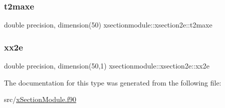 \mbox{\label{structxsectionmodule_1_1xsection2e_aeff16d0efeb0ea2455d947cf854663ec}} 
\subsubsection{\texorpdfstring{t2maxe}{t2maxe}}
{\footnotesize\ttfamily double precision, dimension(50) xsectionmodule\+::xsection2e\+::t2maxe}

\mbox{\label{structxsectionmodule_1_1xsection2e_a2462144f551e80966964150190bcd213}} 
\subsubsection{\texorpdfstring{xx2e}{xx2e}}
{\footnotesize\ttfamily double precision, dimension(50,1) xsectionmodule\+::xsection2e\+::xx2e}



The documentation for this type was generated from the following file\+:\begin{DoxyCompactItemize}
\item 
src/\hyperlink{x_section_module_8f90}{x\+Section\+Module.\+f90}\end{DoxyCompactItemize}
